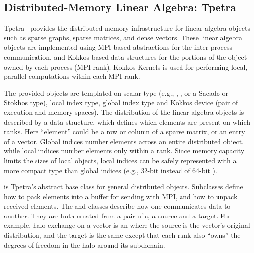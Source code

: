 \subsection{Distributed-Memory Linear Algebra: Tpetra}\label{subsec:tpetra}
Tpetra~\cite{Baker2012,hoemmen2015tpetra} provides the distributed-memory
infrastructure for linear algebra objects such as sparse graphs,
sparse matrices, and dense vectors. These linear algebra objects are
implemented using MPI-based abstractions for the inter-process communication,
and Kokkos-based data structures for the portions of the object
owned by each process (MPI rank). Kokkos Kernels is used for
performing local, parallel computations within each MPI rank.

The provided objects are templated on scalar type (e.g., , , or a Sacado or Stokhos type), local index type, global index type and Kokkos device (pair of execution and memory spaces).
The distribution of the linear algebra objects is described by a  data structure, which defines which elements are present on which ranks.
Here ``element'' could be a row or column of a sparse matrix, or an entry of a vector.
Global indices number elements across an entire distributed object, while local indices number elements only within a rank.
Since memory capacity limits the sizes of local objects, local indices can be safely represented with a more compact type than global indices (e.g., 32-bit  instead of 64-bit ).

 is Tpetra's abstract base class for general distributed objects.
Subclasses define how to pack elements into a buffer for sending with MPI, and how to unpack received elements.
The  and  classes describe how one  communicates data to another.
They are both created from a pair of s, a source and a target. For example, halo exchange on a vector is an  where
the source is the vector's original distribution, and the target is the same except that each rank
also ``owns'' the degrees-of-freedom in the halo around its subdomain.

